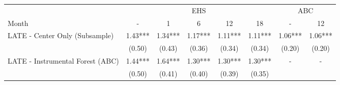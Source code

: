 \begin{tabular}{lccccccc}
\toprule 
\midrule 
 & \multicolumn{5}{c}{EHS} & \multicolumn{2}{c}{ABC} \\
 \cmidrule(lr){2-6} \cmidrule(lr){7-8} 
Month & - & 1 & 6 & 12 & 18 & - & 12 \\
\midrule 
LATE - Center Only (Subsample) & 1.43*** & 1.34*** & 1.17*** & 1.11*** & 1.11*** & 1.06*** & 1.06*** \\
 & (0.50) & (0.43) & (0.36) & (0.34) & (0.34) & (0.20) & (0.20) \\
LATE - Instrumental Forest (ABC) & 1.44*** & 1.64*** & 1.30*** & 1.30*** & 1.30*** & - & - \\
 & (0.50) & (0.41) & (0.40) & (0.39) & (0.35) \\
\midrule 
\bottomrule 
\end{tabular}
